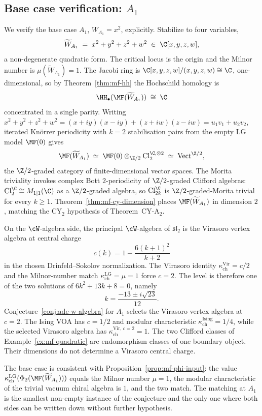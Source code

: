 \subsection*{Base case verification: \texorpdfstring{$A_1$}{A-1}}

We verify the base case $A_1$, $W_{A_1} = x^2$, explicitly. Stabilize to four variables,
\[
 \widetilde{W}_{A_1} \;=\; x^2 + y^2 + z^2 + w^2 \;\in\; \C[x, y, z, w] ,
\]
a non-degenerate quadratic form. The critical locus is the origin and the Milnor number is $\mu(\widetilde{W}_{A_1}) = 1$. The Jacobi ring is $\C[x, y, z, w]/(x, y, z, w) \cong \C$, one-dimensional, so by Theorem~\ref{thm:mf-hh} the Hochschild homology is
\[
 \HH_\bullet(\MF(\widetilde{W}_{A_1})) \;\cong\; \C
\]
concentrated in a single parity. Writing $x^2 + y^2 + z^2 + w^2 = (x{+}iy)(x{-}iy) + (z{+}iw)(z{-}iw) = u_1 v_1 + u_2 v_2$, iterated Kn\"orrer periodicity with $k = 2$ stabilisation pairs from the empty LG model $\MF(0)$ gives
\[
 \MF(\widetilde{W}_{A_1}) \;\simeq\; \MF(0) \otimes_{\Z/2} \mathrm{Cl}_2^{\C, \otimes 2} \;\simeq\; \mathrm{Vect}^{\Z/2},
\]
the $\Z/2$-graded category of finite-dimensional vector spaces. The Morita triviality invokes complex Bott $2$-periodicity of $\Z/2$-graded Clifford algebras: $\mathrm{Cl}^{\C}_2 \cong M_{1|1}(\C)$ as a $\Z/2$-graded algebra, so $\mathrm{Cl}^{\C}_{2k}$ is $\Z/2$-graded-Morita trivial for every $k \geq 1$. Theorem~\ref{thm:mf-cy-dimension} places $\MF(\widetilde{W}_{A_1})$ in dimension $2$, matching the CY$_2$ hypothesis of Theorem~CY-A$_2$.

On the $\cW$-algebra side, the principal $\cW$-algebra of $\mathfrak{sl}_2$ is the Virasoro vertex algebra at central charge
\[
 c(k)=1-\frac{6(k+1)^2}{k+2}
\]
in the chosen Drinfeld--Sokolov normalization. The Virasoro identity
$\kappa_{\mathrm{ch}}^{\mathrm{Vir}}=c/2$ and the Milnor-number match
$\kappa_{\mathrm{ch}}^{\mathrm{LG}}=\mu=1$ force $c=2$. The level is therefore one of
the two solutions of \(6k^2+13k+8=0\), namely
\[
 k=\frac{-13\pm i\sqrt{23}}{12}.
\]
Conjecture~\ref{conj:ade-w-algebra} for $A_1$ selects the Virasoro
vertex algebra at $c=2$. The Ising VOA has $c=1/2$ and modular
characteristic \(\kappa_{\mathrm{ch}}^{\mathrm{Ising}}=1/4\), while the
selected Virasoro algebra has
\(\kappa_{\mathrm{ch}}^{\mathrm{Vir},\,c=2}=1\).
The two Clifford classes of Example~\ref{ex:mf-quadratic} are
endomorphism classes of one boundary object. Their dimensions do
not determine a Virasoro central charge.

The base case is consistent with Proposition~\ref{prop:mf-phi-input}: the value $\kappa_{\mathrm{ch}}^{\mathrm{LG}}(\Phi_2(\MF(\widetilde{W}_{A_1})))$ equals the Milnor number $\mu = 1$, the modular characteristic of the trivial vacuum chiral algebra is $1$, and the two match. The matching at $A_1$ is the smallest non-empty instance of the conjecture and the only one where both sides can be written down without further hypothesis.

